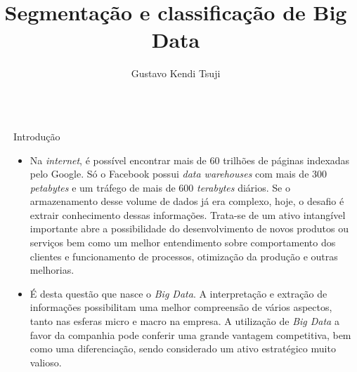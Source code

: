 \documentclass[final,hyperref={pdfpagelabels=false, brazil}]{beamer}
\title{\huge Segmenta\c c\~ao e classifica\c c\~ao de Big Data} %
\author{Gustavo Kendi Tsuji} %
\institute{Universidade de São Paulo} %
\begin{document}

\begin{frame}[t] %

\begin{columns}[t] %

\begin{column}{.02\textwidth}\end{column} %

\begin{column}{.465\textwidth} %

            
\begin{block}{Introdu\c c\~ao}

\begin{itemize}

\item Na \emph{internet}, é possível encontrar mais de 60 trilhões de páginas indexadas pelo Google\cite{GOO01}. Só o Facebook possui \emph{data warehouses} com mais de 300 \emph{petabytes} e um tráfego de mais de 600 \emph{terabytes} diários\cite{FAC01}. Se o armazenamento desse volume de dados já era complexo, hoje, o desafio é extrair conhecimento dessas informações. Trata-se de um ativo intangível importante abre a possibilidade do desenvolvimento de novos produtos ou serviços bem como um melhor entendimento sobre comportamento dos clientes e funcionamento de processos, otimização da produção e outras melhorias.

\item É desta questão que nasce o \emph{Big Data}. A interpretação e extração de informações possibilitam uma melhor compreensão de vários aspectos, tanto nas esferas micro e macro na empresa. A utilização de \emph{Big Data} a favor da companhia pode conferir uma grande vantagem competitiva, bem como uma diferenciação, sendo considerado um ativo estratégico muito valioso.

\end{itemize}


\end{block}
\end{column}
\end{columns}
\end{frame}
\end{document}

